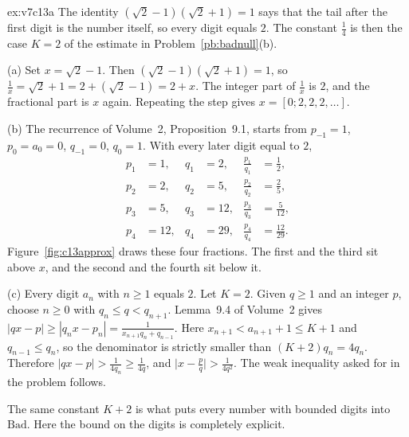 \begin{solution}{ex:v7c13a}
\idea The identity $(\sqrt2-1)(\sqrt2+1)=1$ says that the tail after the first digit is the number itself, so every digit equals $2$. The constant $\frac14$ is then the case $K=2$ of the estimate in Problem~\ref{pb:badnull}(b).

\writeup (a) Set $x=\sqrt2-1$. Then $(\sqrt2-1)(\sqrt2+1)=1$, so $\frac1x=\sqrt2+1=2+(\sqrt2-1)=2+x$. The integer part of $\frac1x$ is $2$, and the fractional part is $x$ again. Repeating the step gives $x=[0;2,2,2,\dots]$.

(b) The recurrence of Volume~2, Proposition~9.1, starts from $p_{-1}=1$, $p_0=a_0=0$, $q_{-1}=0$, $q_0=1$. With every later digit equal to $2$,
\[
\begin{aligned}
p_1&=1,&q_1&=2,&\frac{p_1}{q_1}&=\frac12,\\
p_2&=2,&q_2&=5,&\frac{p_2}{q_2}&=\frac25,\\
p_3&=5,&q_3&=12,&\frac{p_3}{q_3}&=\frac5{12},\\
p_4&=12,&q_4&=29,&\frac{p_4}{q_4}&=\frac{12}{29}.
\end{aligned}
\]
Figure~\ref{fig:c13approx} draws these four fractions. The first and the third sit above $x$, and the second and the fourth sit below it.

(c) Every digit $a_n$ with $n\ge 1$ equals $2$. Let $K=2$. Given $q\ge 1$ and an integer $p$, choose $n\ge 0$ with $q_n\le q<q_{n+1}$. Lemma~9.4 of Volume~2 gives $|qx-p|\ge|q_nx-p_n|=\frac1{x_{n+1}q_n+q_{n-1}}$. Here $x_{n+1}<a_{n+1}+1\le K+1$ and $q_{n-1}\le q_n$, so the denominator is strictly smaller than $(K+2)q_n=4q_n$. Therefore $|qx-p|>\frac1{4q_n}\ge\frac1{4q}$, and $\bigl|x-\frac pq\bigr|>\frac1{4q^2}$. The weak inequality asked for in the problem follows.

\leads The same constant $K+2$ is what puts every number with bounded digits into $\mathrm{Bad}$. Here the bound on the digits is completely explicit.
\end{solution}

